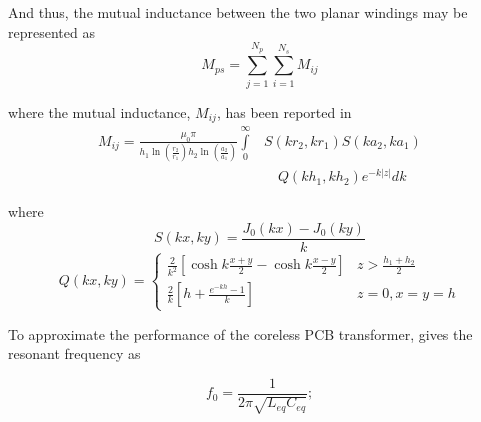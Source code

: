 \documentclass[conference]{IEEEtran}
\begin{document}
\hspace{-20pt} And thus, the mutual inductance between the two planar windings may be represented as
%
\begin{equation}
	M_{ps} = \sum\limits_{j=1}^{N_{p}}{\sum\limits_{i=1}^{N_{s}}{M_{ij}}}
\end{equation}

\hspace{-20pt} where the mutual inductance, $ M_{ij} $, has been reported in \cite{HurleyDuffy}
\begin{equation}
\begin{split}
	M_{ij} = \frac{\mu_{0}\pi}{h_{1}\ln(\frac{r_{2}}{r_{1}})h_{2}\ln(\frac{a_{2}}{a_{1}})}\int\limits_{0}^{\infty} & S(kr_{2},kr_{1})S(ka_{2},ka_{1}) 
	\\ &\quad {Q(kh_{1},kh_{2})e^{-k|z|}dk}
\end{split}
\end{equation}

\hspace{-20pt} where
\begin{equation}
	S(kx, ky) = \frac{J_{0}(kx) - J_{0}(ky)}{k}
\end{equation}
%
\begin{equation}
	Q(kx, ky) = \left\{
		\begin{array}{lr}
		\frac{2}{k^{2}} \left[ \cosh{k\frac{x+y}{2}}-\cosh{k\frac{x-y}{2}} \right] & z>\frac{h_{1}+h_{2}}{2} \\
		\frac{2}{k} \left[ h+\frac{e^{-kh}-1}{k} \right] & z=0, x=y=h
		\end{array}
   \right.
\end{equation}

\hspace{-20pt} To approximate the performance of the coreless PCB transformer, \cite{TangHuiFundamental} gives the resonant frequency as

\begin{equation}
	f_{0} = \frac{1}{2\pi\sqrt{L_{eq}C_{eq}}};
\end{equation}
\end{document}
